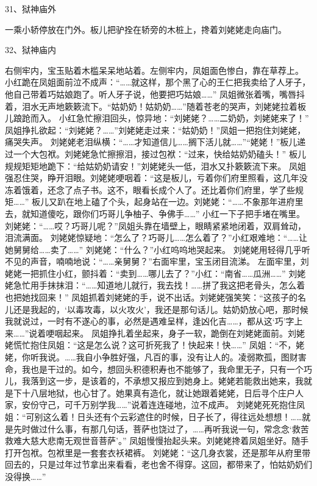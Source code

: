 31、狱神庙外\par
一乘小轿停放在门外。板儿把驴拴在轿旁的木桩上，搀着刘姥姥走向庙门。

32、狱神庙内\par
右侧牢内，宝玉贴着木槛呆呆地站着。左侧牢内，凤姐面色惨白，靠在草荐上。
小红跪在凤姐面前泣不成声：“……就这样，那个黑了心的王仁把我卖给了人牙子，他自己带着巧姑娘跑了。听人牙子说，他要把巧姑娘……”
凤姐微张着嘴，嘴唇抖着，泪水无声地簌簌流下。“姑奶奶！姑奶奶……”随着苍老的哭声，刘姥姥拉着板儿踉跄而入。
小红急忙擦泪回头，惊异地：“刘姥姥？……二奶奶，刘姥姥来了！”
凤姐挣扎欲起：“刘姥姥？……”刘姥姥走过来：“姑奶奶！”凤姐一把抱住刘姥姥，痛哭失声。
刘姥姥老泪纵横：“……才知道信儿……搁下活儿就……”“姥姥！”板儿递过一个大包袱。刘姥姥急忙擦擦泪，接过包袱：“过来，快给姑奶奶磕头！”
板儿规规矩矩地跪下：“给姑奶奶请安！”刘姥姥头一低，泪水又扑簌簌流下来。
凤姐强忍住哭，睁开泪眼。刘姥姥哽咽着：“这是板儿，亏着你们府里照看，这几年没冻着饿着，还念了点子书。这不，眼看长成个人了。还比着你们府里，学了些规矩……”
板儿又趴在地上磕了个头，起身站在一边。刘姥姥：“……不象那年进府里去，就知道傻吃，跟你们巧哥儿争柚子、争佛手……”
小红一下子把手堵在嘴里。刘姥姥：“……哎？巧哥儿呢？”凤姐头靠在墙壁上，眼睛紧紧地闭着，双肩耸动，泪流满面。
刘姥姥惊疑地：“怎么了？巧哥儿……怎么着了？”小红艰难地：“……让她舅舅给……卖了……”
刘姥姥：“什么？”小红呜呜地哭起来。
刘姥姥用轻得几乎听不见的声音，喃喃地说：“……亲舅舅？”右面牢里，宝玉闭目流涕。
左面牢里，刘姥姥一把抓住小红，颤抖着：“卖到……哪儿去了？”小红：“南省……瓜洲……”
刘姥姥急忙用手抹抹泪：“……知道地儿就行，我去找！……拼了我这把老骨头，怎么着也把她找回来！”
凤姐抓着刘姥姥的手，说不出话。刘姥姥强笑笑：“这孩子的名儿还是我起的，‘以毒攻毒，以火攻火’，我还是那句话儿。姑奶奶放心吧，那时候我就说过，一时有不遂心的事，必然是遇难呈样，逢凶化吉……，都从这‘巧’字上来……”说着哽咽起来。
凤姐挣扎着坐起来，身子一软，跪倒在刘姥姥面前。刘姥姥慌忙抱住凤姐：“这是怎么说？这可折死我了！快起来！快……”
凤姐：“不，姥姥，你听我说。……我自小争胜好强，凡百的事，没有让人的。凌弱欺孤，图财害命，我也是干过的。如今，想回头积德积寿也不能够了，我命里无子，只有一个巧儿，我落到这一步，是该着的，不承想又报应到她身上。姥姥若能救出她来，我就是下十八层地狱，也心甘了。她果真有造化，就让她跟着姥姥，日后寻个庄户人家，安份守己，可千万别学我……”说着连连碰地，泣不成声。
刘姥姥死死抱住凤姐：“可别这么着！日头还有个云彩遮住的时候，日子长了，得往远处想想！……就是先时做过什么事，有那几句话，菩萨也饶过了，……再听我说一句，常念念‘救苦救难大慈大悲南无观世音菩萨’。”
凤姐慢慢抬起头来。刘姥姥搀着凤姐坐好。随手打开包袱。包袱里是一套套衣袄裙裤。
刘姥姥：“这几身衣裳，还是那年从府里带回去的，只是过年过节拿出来看看，老也舍不得穿。这回，都带来了，怕姑奶奶们没得换……”
